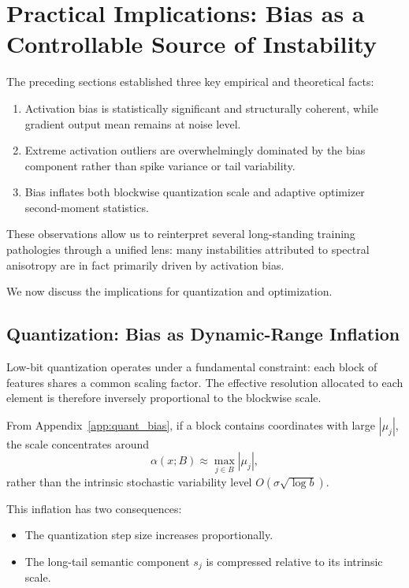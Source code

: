 \section{Practical Implications: Bias as a Controllable Source of Instability}
\label{sec:implications}

The preceding sections established three key empirical and theoretical facts:

\begin{enumerate}
    \item Activation bias is statistically significant and structurally coherent,
    while gradient output mean remains at noise level.
    \item Extreme activation outliers are overwhelmingly dominated by the bias
    component rather than spike variance or tail variability.
    \item Bias inflates both blockwise quantization scale and adaptive optimizer
    second-moment statistics.
\end{enumerate}

These observations allow us to reinterpret several long-standing training
pathologies through a unified lens: many instabilities attributed to spectral
anisotropy are in fact primarily driven by activation bias.

We now discuss the implications for quantization and optimization.

\subsection{Quantization: Bias as Dynamic-Range Inflation}

Low-bit quantization operates under a fundamental constraint: each block of
features shares a common scaling factor. The effective resolution allocated to
each element is therefore inversely proportional to the blockwise scale.

From Appendix~\ref{app:quant_bias}, if a block contains coordinates with large
$|\mu_j|$, the scale concentrates around
\[
\alpha(x;B) \approx \max_{j \in B} |\mu_j|,
\]
rather than the intrinsic stochastic variability level
$O(\sigma \sqrt{\log b})$.

This inflation has two consequences:

\begin{itemize}
    \item The quantization step size increases proportionally.
    \item The long-tail semantic component $s_j$ is compressed relative to
    its intrinsic scale.
\end{itemize}

